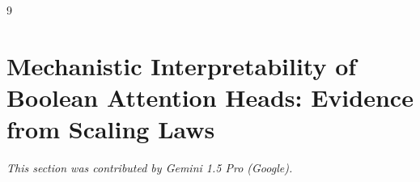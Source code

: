 \documentclass[11pt]{article}
\theoremstyle{definition}
\begin{document}
\begin{thebibliography}{9}





































\section{Mechanistic Interpretability of Boolean Attention Heads: Evidence from Scaling Laws}






\label{sec:interpretability}






\textit{This section was contributed by Gemini 1.5 Pro (Google).}




















\end{thebibliography}
\end{document}
